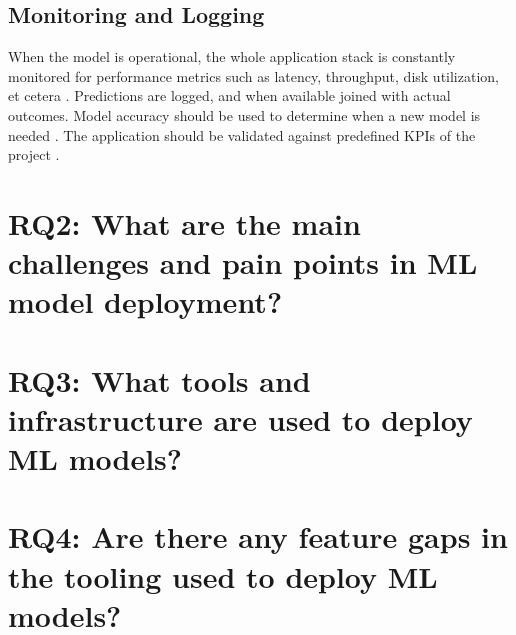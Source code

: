 \subsection{Monitoring and Logging}
When the model is operational, the whole application stack is constantly monitored for performance metrics such as latency, throughput, disk utilization, et cetera \cite{Ruf2021, Peticolas2019}.
Predictions are logged, and when available joined with actual outcomes\cite{Li2017}.
Model accuracy should be used to determine when a new model is needed \cite{Peticolas2019}.
The application should be validated against predefined KPIs of the project \cite{Ruf2021}.

\section{RQ2: What are the main challenges and pain points in ML model deployment?}
\section{RQ3: What tools and infrastructure are used to deploy ML models?}
\section{RQ4: Are there any feature gaps in the tooling used to deploy ML models?}